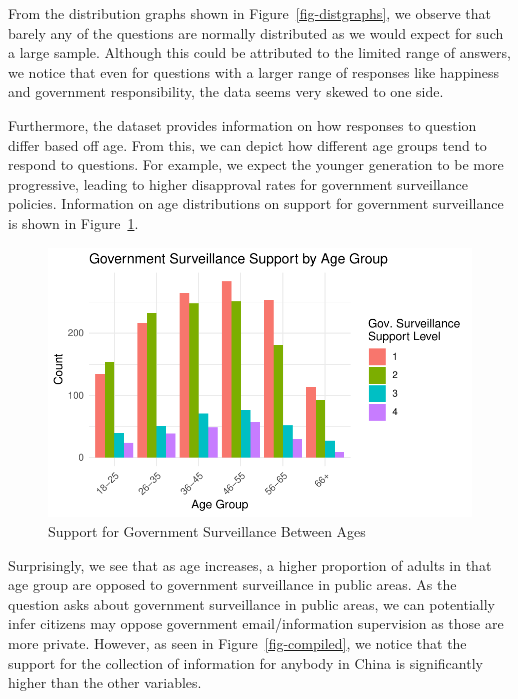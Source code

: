 \documentclass[
  letterpaper,
  DIV=11,
  numbers=noendperiod]{scrartcl}
\begin{document}
From the distribution graphs shown in Figure~\ref{fig-distgraphs}, we
observe that barely any of the questions are normally distributed as we
would expect for such a large sample. Although this could be attributed
to the limited range of answers, we notice that even for questions with
a larger range of responses like happiness and government
responsibility, the data seems very skewed to one side.

Furthermore, the dataset provides information on how responses to
question differ based off age. From this, we can depict how different
age groups tend to respond to questions. For example, we expect the
younger generation to be more progressive, leading to higher disapproval
rates for government surveillance policies. Information on age
distributions on support for government surveillance is shown in
Figure~\ref{fig-govsurvsup}.

\begin{figure}

{\centering \includegraphics{paper_files/figure-pdf/fig-govsurvsup-1.pdf}

}

\caption{\label{fig-govsurvsup}Support for Government Surveillance
Between Ages}

\end{figure}

Surprisingly, we see that as age increases, a higher proportion of
adults in that age group are opposed to government surveillance in
public areas. As the question asks about government surveillance in
public areas, we can potentially infer citizens may oppose government
email/information supervision as those are more private. However, as
seen in Figure~\ref{fig-compiled}, we notice that the support for the
collection of information for anybody in China is significantly higher
than the other variables.
\end{document}
